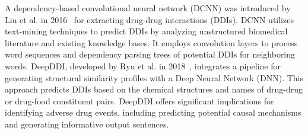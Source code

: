 \documentclass[unnumsec,webpdf,contemporary,large]{oup-authoring-template}%
\theoremstyle{thmstyleone}%
\theoremstyle{thmstyletwo}%
\theoremstyle{thmstylethree}%
\begin{document}
A dependency-based convolutional neural network (DCNN) was introduced by Liu et al. in 2016~\cite{shengyu2016} for extracting drug-drug interactions (DDIs). DCNN utilizes text-mining techniques to predict DDIs by analyzing unstructured biomedical literature and existing knowledge bases. It employs convolution layers to process word sequences and dependency parsing trees of potential DDIs for neighboring words. DeepDDI, developed by Ryu et al. in 2018~\cite{Ryu2018}, integrates a pipeline for generating structural similarity profiles with a Deep Neural Network (DNN). This approach predicts DDIs based on the chemical structures and names of drug-drug or drug-food constituent pairs. DeepDDI offers significant implications for identifying adverse drug events, including predicting potential causal mechanisms and generating informative output sentences.
\end{document}

